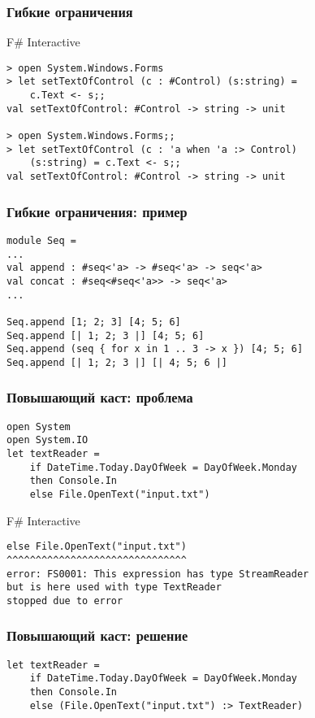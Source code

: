 \documentclass[xetex,mathserif,serif]{beamer}
\begin{document}
    \begin{frame}[fragile]
        \frametitle{Гибкие ограничения}
        \begin{alertblock}{F\# Interactive}
            \begin{verbatim}
> open System.Windows.Forms
> let setTextOfControl (c : #Control) (s:string) = 
    c.Text <- s;;
val setTextOfControl: #Control -> string -> unit

> open System.Windows.Forms;;
> let setTextOfControl (c : 'a when 'a :> Control) 
    (s:string) = c.Text <- s;;
val setTextOfControl: #Control -> string -> unit
            \end{verbatim}
        \end{alertblock}
    \end{frame}

    \begin{frame}[fragile]
        \frametitle{Гибкие ограничения: пример}
        \begin{verbatim}
module Seq =
...
val append : #seq<'a> -> #seq<'a> -> seq<'a>
val concat : #seq<#seq<'a>> -> seq<'a>
...

Seq.append [1; 2; 3] [4; 5; 6]
Seq.append [| 1; 2; 3 |] [4; 5; 6]
Seq.append (seq { for x in 1 .. 3 -> x }) [4; 5; 6]
Seq.append [| 1; 2; 3 |] [| 4; 5; 6 |]
        \end{verbatim}
    \end{frame}

    \begin{frame}[fragile]
        \frametitle{Повышающий каст: проблема}
        \begin{verbatim}
open System
open System.IO
let textReader =
    if DateTime.Today.DayOfWeek = DayOfWeek.Monday
    then Console.In
    else File.OpenText("input.txt")
        \end{verbatim}

        \begin{alertblock}{F\# Interactive}
            \begin{verbatim}
else File.OpenText("input.txt")
^^^^^^^^^^^^^^^^^^^^^^^^^^^^^^^
error: FS0001: This expression has type StreamReader 
but is here used with type TextReader 
stopped due to error
            \end{verbatim}
        \end{alertblock}
    \end{frame}

    \begin{frame}[fragile]
        \frametitle{Повышающий каст: решение}
        \begin{verbatim}
let textReader =
    if DateTime.Today.DayOfWeek = DayOfWeek.Monday
    then Console.In
    else (File.OpenText("input.txt") :> TextReader)
        \end{verbatim}
    \end{frame}
\end{document}
